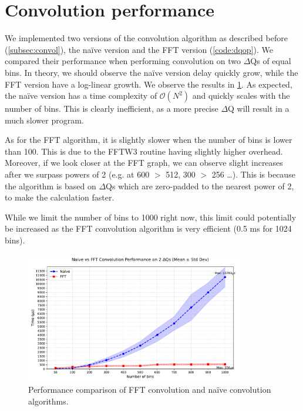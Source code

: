 \section{Convolution performance}
    We implemented two versions of the convolution algorithm as described before (\cref{subsec:convol}), the naïve version and the FFT version (\cref{code:dqop}). We compared their performance when performing convolution on two $\Delta$Qs of equal bins. In theory, we should observe the naïve version delay quickly grow, while the FFT version have a log-linear growth. We observe the results in \cref{fig:conv_perf}.
    As expected, the naïve version has a time complexity of $\mathcal{O}(N^2)$ and quickly scales with the number of bins. This is clearly inefficient, as a more precise $\Delta$Q will result in a much slower program.

As for the FFT algorithm, it is slightly slower when the number of bins is lower than 100. This is due to the FFTW3 routine having slightly higher overhead. Moreover, if we look closer at the FFT graph, we can observe slight increases after we surpass powers of 2 (e.g. at 600 $>$ 512, 300 $>$ 256 \dots). This is because the algorithm is based on $\Delta$Qs which are zero-padded to the nearest power of 2, to make the calculation faster.

While we limit the number of bins to 1000 right now, this limit could potentially be increased as the FFT convolution algorithm is very efficient (0.5 ms for 1024 bins).

    \begin{figure}[H]
        \begin{center}
            \includegraphics[width=0.85\textwidth]{img/conv_perf.pdf}
        \end{center}
        \caption{Performance comparison of FFT convolution and naïve convolution algorithms.}
        \label{fig:conv_perf}
    \end{figure}


